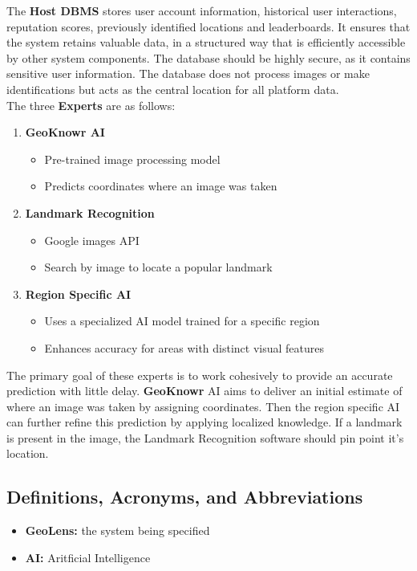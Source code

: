 \documentclass[]{article}
\begin{document}
The \textbf{Host DBMS} stores user account information, historical user interactions, reputation scores, previously identified locations and leaderboards. It ensures that the system retains valuable data,
in a structured way that is efficiently accessible by other system components. The database should be highly secure, as it contains sensitive user information. The database does not process images or make
identifications but acts as the central location for all platform data. \\

The three \textbf{Experts} are as follows:
\begin{enumerate}
    \item \textbf{GeoKnowr AI}
    \begin{itemize}
        \item Pre-trained image processing model
        \item Predicts coordinates where an image was taken
    \end{itemize}
    \item \textbf{Landmark Recognition}
    \begin{itemize}
        \item Google images API
        \item Search by image to locate a popular landmark
    \end{itemize}
	\item \textbf{Region Specific AI}
	\begin{itemize}
        \item Uses a specialized AI model trained for a specific region
        \item Enhances accuracy for areas with distinct visual features
    \end{itemize}
\end{enumerate}

The primary goal of these experts is to work cohesively to provide an accurate prediction with little delay. \textbf{GeoKnowr} AI aims to deliver an initial estimate
of where an image was taken by assigning coordinates. Then the region specific AI can further refine this prediction by applying localized knowledge. If a landmark is 
present in the image, the Landmark Recognition software should pin point it's location.

\subsection{Definitions, Acronyms, and Abbreviations}
\label{sub:definitions_acronyms_and_abbreviations}
\begin{itemize}
	\item \textbf{GeoLens:} the system being specified
	\item \textbf{AI:} Aritficial Intelligence
\end{itemize}
\end{document}
